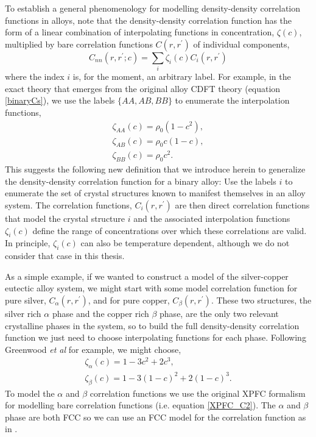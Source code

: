 \documentclass[showkeys, prb, reprint]{revtex4-1}
\begin{document}
To establish a general phenomenology for modelling density-density correlation
functions in alloys, note that the density-density correlation function has the
form of a linear combination of interpolating functions in concentration,
$\zeta(c)$, multiplied by bare correlation functions $C(r, r^\prime)$ of
individual components,
%
\begin{equation}
    C_{nn}(r, r^\prime; c) = \sum_i \zeta_i(c) C_i(r, r^\prime)
\end{equation}
%
where the index $i$ is, for the moment, an arbitrary label. For example, in the
exact theory that emerges from the original alloy CDFT theory (equation
\ref{binaryCs}), we use the labels $\lbrace AA, AB, BB\rbrace$ to enumerate the
interpolation functions, 
%
\begin{gather}
    \zeta_{AA}(c) = \rho_0 (1 - c^2), \\
    \zeta_{AB}(c) = \rho_0 c (1 - c ), \\
    \zeta_{BB}(c) = \rho_0 c^2.
\end{gather}
%
This suggests the following new definition that we introduce herein to
generalize the density-density correlation function for a binary alloy: Use the
labels $i$ to enumerate the set of crystal structures known to manifest
themselves in an alloy system. The correlation functions, $C_i(r, r^\prime)$
are then direct correlation functions that model the crystal structure $i$ and
the associated interpolation functions $\zeta_i(c)$ define the range of
concentrations over which these correlations are valid. In principle,
$\zeta_i(c)$ can also be temperature dependent, although we do not consider
that case in this thesis.

As a simple example, if we wanted to construct a model of the silver-copper
eutectic alloy system, we might start with some model correlation function for
pure silver, $C_\alpha(r, r^\prime)$, and for pure copper, $C_\beta(r,
r^\prime)$. These two structures, the silver rich $\alpha$ phase and the copper
rich $\beta$ phase, are the only two relevant crystalline phases in the system,
so to build the full density-density correlation function we just need to
choose interpolating functions for each phase. Following Greenwood \textit{et
al} for example, we might choose,
%
\begin{gather}
    \zeta_\alpha(c) = 1 - 3c^2 + 2c^3, \\
    \zeta_\beta(c) = 1 - 3 (1 - c)^2 + 2(1 - c)^3.
\end{gather}
%
To model the $\alpha$ and $\beta$ correlation functions we use the original
XPFC formalism for modelling bare correlation functions (i.e. equation
\ref{XPFC_C2}). The $\alpha$ and $\beta$ phase are both FCC
\cite{SUBRAMANIAN93} so we can use an FCC model for the correlation function as
in \cite{GREENWOOD10}.
\end{document}
